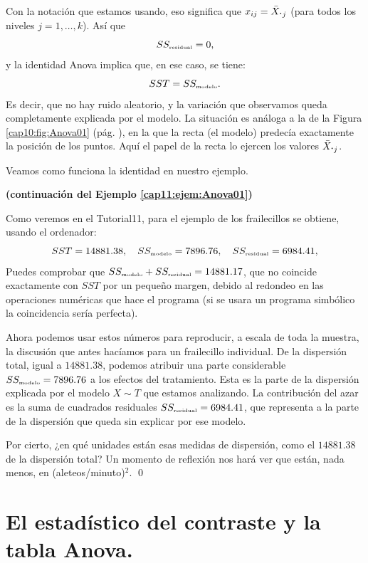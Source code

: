 Con la notación que estamos usando, eso significa que $x_{ij}=\bar X_{\mbox{\bf\large $\cdot$}j}$
(para todos los niveles $j=1,\ldots,k$). Así que
\[SS_{\mbox{\tiny residual}}=0,\]
y la identidad Anova implica que, en ese caso, se tiene:
\[SST=  SS_{\mbox{\tiny modelo}}.\]
Es decir, que no hay ruido aleatorio, y la variación que observamos queda completamente explicada por el modelo. La situación es análoga a la de la Figura \ref{cap10:fig:Anova01} (pág. \pageref{cap10:fig:Anova01}), en la que la recta (el modelo) predecía exactamente la posición de los puntos. Aquí el papel de la recta lo ejercen los valores $\bar X_{\mbox{\bf\large $\cdot$}j}$.

Veamos como funciona la identidad en nuestro ejemplo.
\begin{ejemplo}{\bf (continuación del Ejemplo \ref{cap11:ejem:Anova01})}
\label{cap11:ejem:Anova01e}

Como veremos en el Tutorial11, para el ejemplo de los frailecillos se obtiene, usando el ordenador:
\[SST=14881.38,\quad  SS_{\mbox{\tiny modelo}} = 7896.76, \quad  SS_{\mbox{\tiny residual}} = 6984.41,\]
Puedes comprobar que $SS_{\mbox{\tiny modelo}}+SS_{\mbox{\tiny residual}}=14881.17$, que no
coincide exactamente con $SST$ por un pequeño margen, debido al redondeo en las operaciones
numéricas que hace el programa (si se usara un programa simbólico la coincidencia sería perfecta).

Ahora podemos usar estos números para reproducir, a escala de toda la muestra, la discusión que
antes hacíamos para un frailecillo individual. De la dispersión total, igual a $14881.38$, podemos
atribuir una parte considerable $SS_{\mbox{\tiny modelo}} = 7896.76$ a los efectos del tratamiento.
Esta es la parte de la dispersión explicada por el modelo $X\sim T$ que estamos analizando. La
contribución del azar es la suma de cuadrados residuales $SS_{\mbox{\tiny residual}}=6984.41$, que
representa a la parte de la dispersión que queda sin explicar por ese modelo.

Por cierto, ¿en qué unidades están esas medidas de dispersión, como el $14881.38$ de la dispersión total? Un momento de reflexión nos hará ver que están, nada menos, en (aleteos/minuto)$^2$.
\qed
\end{ejemplo}

\section{El estadístico del contraste y la tabla Anova.}
\label{cap11:sec:EstadisticoContrasteTablaAnova}

